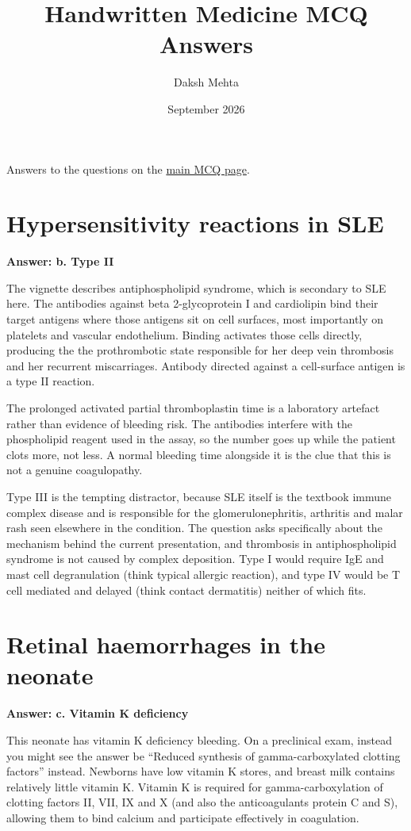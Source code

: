 \documentclass{article}
\title{Handwritten Medicine MCQ Answers}
\date{September 2026}
\author{Daksh Mehta}
\begin{document}
Answers to the questions on the \href{handwritten-medicine-mcqs.html}{main MCQ page}. 

\tableofcontents

\section{Hypersensitivity reactions in SLE}

\textbf{Answer: b. Type II}

The vignette describes antiphospholipid syndrome, which is secondary to SLE here. The antibodies against beta 2-glycoprotein I and cardiolipin bind their target antigens where those antigens sit on cell surfaces, most importantly on platelets and vascular endothelium. Binding activates those cells directly, producing the the prothrombotic state responsible for her deep vein thrombosis and her recurrent miscarriages. Antibody directed against a cell-surface antigen is a type II reaction.

The prolonged activated partial thromboplastin time is a laboratory artefact rather than evidence of bleeding risk. The antibodies interfere with the phospholipid reagent used in the assay, so the number goes up while the patient clots more, not less. A normal bleeding time alongside it is the clue that this is not a genuine coagulopathy.

Type III is the tempting distractor, because SLE itself is the textbook immune complex disease and is responsible for the glomerulonephritis, arthritis and malar rash seen elsewhere in the condition. The question asks specifically about the mechanism behind the current presentation, and thrombosis in antiphospholipid syndrome is not caused by complex deposition. Type I would require IgE and mast cell degranulation (think typical allergic reaction), and type IV would be T cell mediated and delayed (think contact dermatitis) neither of which fits.

\section{Retinal haemorrhages in the neonate}

\textbf{Answer: c. Vitamin K deficiency}

This neonate has vitamin K deficiency bleeding. On a preclinical exam, instead you might see the answer be ``Reduced synthesis of gamma-carboxylated clotting factors'' instead. Newborns have low vitamin K stores, and breast milk contains relatively little vitamin K. Vitamin K is required for gamma-carboxylation of clotting factors II, VII, IX and X (and also the anticoagulants protein C and S), allowing them to bind calcium and participate effectively in coagulation. 
\end{document}
